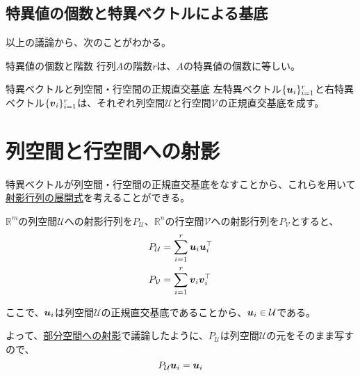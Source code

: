 \documentclass[../../../topic_linear-algebra]{subfiles}
\begin{document}
\subsection{特異値の個数と特異ベクトルによる基底}

以上の議論から、次のことがわかる。

\begin{theorem}{特異値の個数と階数}\label{thm:rank-and-singular-values}
  行列$A$の階数$r$は、$A$の特異値の個数に等しい。
\end{theorem}

\begin{theorem}{特異ベクトルと列空間・行空間の正規直交基底}
  左特異ベクトル$\{\vb*{u}_i\}_{i=1}^r$と右特異ベクトル$\{\vb*{v}_i\}_{i=1}^r$は、それぞれ列空間$\mathcal{U}$と行空間$\mathcal{V}$の正規直交基底を成す。
\end{theorem}

\sectionline
\section{列空間と行空間への射影}

特異ベクトルが列空間・行空間の正規直交基底をなすことから、これらを用いて\hyperref[sec:projection-matrix-expansion]{射影行列の展開式}を考えることができる。

\br

$\mathbb{R}^m$の列空間$\mathcal{U}$への射影行列を$P_{\mathcal{U}}$、$\mathbb{R}^n$の行空間$\mathcal{V}$への射影行列を$P_{\mathcal{V}}$とすると、
\begin{align*}
  P_{\mathcal{U}} & = \sum_{i=1}^r \vb*{u}_i \vb*{u}_i^\top \\
  P_{\mathcal{V}} & = \sum_{i=1}^r \vb*{v}_i \vb*{v}_i^\top
\end{align*}

\br

ここで、$\vb*{u}_i$は列空間$\mathcal{U}$の正規直交基底であることから、$\vb*{u}_i \in \mathcal{U}$である。

よって、\hyperref[sec:projection-onto-subspace]{部分空間への射影}で議論したように、$P_{\mathcal{U}}$は列空間$\mathcal{U}$の元をそのまま写すので、
\begin{equation*}
  P_{\mathcal{U}}\vb*{u}_i = \vb*{u}_i
\end{equation*}
\end{document}

